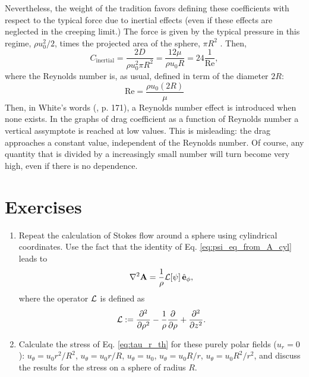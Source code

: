 Nevertheless, the weight of the tradition favors defining these
coefficients with respect to the typical force due to inertial effects
(even if these effects are neglected in the creeping limit.) The force
is given by the typical pressure in this regime, $\rho u_0^2 / 2 $,
times the projected area of the sphere, $\pi R^2$ . Then,
\[
  C_\mathrm{inertial} = \frac{  2 D }{ \rho u_0^2 \pi R^2 } =
  \frac{  12 \mu  }{ \rho u_0 R }   =
  24 \frac{1}{\mathrm{Re}} ,
\]
where the Reynolds number is, as usual, defined in term of the
diameter $2R$:
\[
  \mathrm{Re} = \frac{ \rho u_0 ( 2 R ) }{ \mu } 
\]
Then, in White's words (\cite{white1991viscous}, p. 171), a Reynolds
number effect is introduced when none exists. In the graphs of drag
coefficient as a function of Reynolds number a vertical assymptote is
reached at low values. This is misleading: the drag approaches a
constant value, independent of the Reynolds number. Of course, any
quantity that is divided by a increasingly small number will turn
become very high, even if there is no dependence.


\section{Exercises}


\begin{enumerate}

\item Repeat the calculation of Stokes flow around a sphere using
  cylindrical coordinates. Use the fact that the identity of
  Eq. \ref{eq:psi_eq_from_A_cyl} leads to
  \begin{equation*}
    \nabla^2 \mathbf{A} = \frac{1}{\rho } {\cal L} [\psi] \, \hat{\mathbf{e}}_\phi ,
  \end{equation*}
  where the operator $\cal L$ is defined as
  \[
    {\cal L} :=
    \frac{\partial^2  }{\partial \rho^2} -
    \frac{1}{ \rho } 
    \frac{\partial  }{\partial \rho} +
    \frac{\partial^2  }{\partial z^2}.
  \]
\item \label{ex:tau_r_th} Calculate the stress of
  Eq. \ref{eq:tau_r_th} for these purely polar fields ($u_r=0$):
  $u_\theta = u_0 r^2/R^2$,
  $u_\theta = u_0 r / R$,
  $u_\theta = u_0$,
  $u_\theta = u_0 R/r$,
  $u_\theta = u_0 R^2/r^2$,
  and discuss the results for the stress on a sphere of radius $R$.

\end{enumerate}